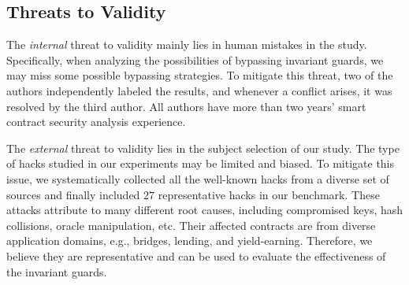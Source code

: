 \subsection{Threats to Validity}

The \emph{internal} threat to validity mainly lies in human mistakes in the study. Specifically,
when analyzing the possibilities of bypassing invariant guards, we may miss some possible bypassing
strategies.
To mitigate this threat, two of the authors independently labeled the results, and whenever a
conflict arises, it was resolved by the third author.
All authors have more than two years' smart contract security analysis experience.

The \emph{external} threat to validity lies in the subject selection of our study.
The type of hacks studied in our experiments may be limited and biased.
To mitigate this issue, we systematically collected all the well-known hacks from a diverse set of
sources and finally included $27$ representative hacks in our benchmark.
These attacks attribute to many different root causes, including compromised keys, hash collisions,
oracle manipulation, etc.
Their affected contracts are from diverse application domains, e.g., bridges, lending, and
yield-earning.
Therefore, we believe they are representative and can be used to evaluate the effectiveness of the
invariant guards.
